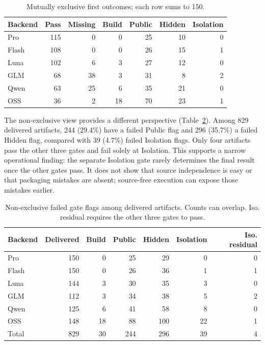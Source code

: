 \documentclass[acmsmall,screen,review,anonymous]{acmart}
\begin{document}
\begin{table}[t]
 \caption{Mutually exclusive first outcomes; each row sums to 150.}
 \label{tab:funnel}
 \centering
 \begin{tabular}{@{}lrrrrrr@{}}
 \toprule
 Backend & Pass & Missing & Build & Public & Hidden & Isolation \\
 \midrule
 Pro & 115 & 0 & 0 & 25 & 10 & 0 \\
 Flash & 108 & 0 & 0 & 26 & 15 & 1 \\
 Luna & 102 & 6 & 3 & 27 & 12 & 0 \\
 GLM & 68 & 38 & 3 & 31 & 8 & 2 \\
 Qwen & 63 & 25 & 6 & 35 & 21 & 0 \\
 OSS & 36 & 2 & 18 & 70 & 23 & 1 \\
 \bottomrule
 \end{tabular}
\end{table}

The non-exclusive view provides a different perspective
(Table~\ref{tab:independent-gates}). Among 829 delivered artifacts, 244 (29.4\%)
have a failed Public flag and 296 (35.7\%) a failed Hidden flag, compared with
39 (4.7\%) failed Isolation flags. Only four artifacts pass the other three
gates and fail solely at Isolation. This supports a narrow operational finding:
the separate Isolation gate rarely determines the final result once the other
gates pass. It does not show that source independence is easy or that packaging
mistakes are absent; source-free execution can expose those mistakes earlier.

\begin{table}[t]
 \caption{Non-exclusive failed gate flags among delivered artifacts. Counts
 can overlap. Iso. residual requires the other three gates to pass.}
 \label{tab:independent-gates}
 \centering\small
 \begin{tabular}{@{}lrrrrrr@{}}
 \toprule
 Backend & Delivered & Build & Public & Hidden & Isolation & Iso. residual \\
 \midrule
 Pro & 150 & 0 & 25 & 29 & 0 & 0 \\
 Flash & 150 & 0 & 26 & 36 & 1 & 1 \\
 Luna & 144 & 3 & 30 & 35 & 3 & 0 \\
 GLM & 112 & 3 & 34 & 38 & 5 & 2 \\
 Qwen & 125 & 6 & 41 & 58 & 8 & 0 \\
 OSS & 148 & 18 & 88 & 100 & 22 & 1 \\
 \midrule
 Total & 829 & 30 & 244 & 296 & 39 & 4 \\
 \bottomrule
 \end{tabular}
\end{table}
\end{document}
